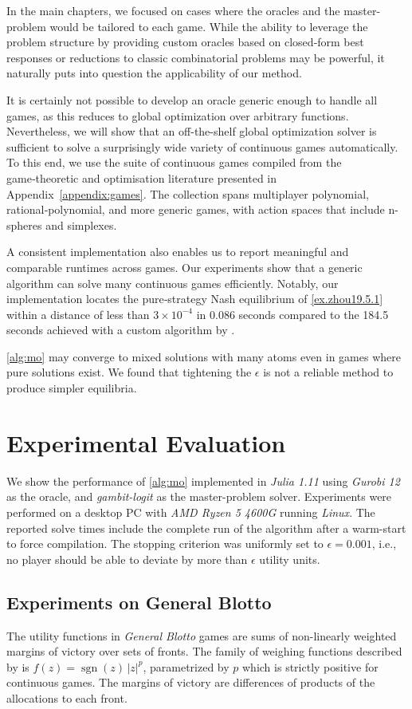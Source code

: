 \documentclass[../main.tex]{subfiles}
\begin{document}
In the main chapters, we focused on cases where the oracles and the master-problem would be tailored to each game. While the ability to leverage the problem structure by providing custom oracles based on closed‑form best responses or reductions to classic combinatorial problems may be powerful, it naturally puts into question the applicability of our method.

It is certainly not possible to develop an oracle generic enough to handle all games, as this reduces to global optimization over arbitrary functions. Nevertheless, we will show that an off-the-shelf global optimization solver is sufficient to solve a surprisingly wide variety of continuous games automatically. To this end, we use the suite of continuous games compiled from the game‑theoretic and optimisation literature presented in Appendix~\ref{appendix:games}. The collection spans multiplayer polynomial, rational‑polynomial, and more generic games, with action spaces that include n-spheres and simplexes.

A consistent implementation also enables us to report meaningful and comparable runtimes across games. Our experiments show that a generic algorithm can solve many continuous games efficiently. Notably, our implementation locates the pure‑strategy Nash equilibrium of \cref{ex.zhou19.5.1} within a distance of less than $3\times 10^{-4}$ in 0.086 seconds compared to the 184.5 seconds achieved with a custom algorithm by \textcite{zhou.wang.ea:saddle}.

\cref{alg:mo} may converge to mixed solutions with many atoms even in games where pure solutions exist. We found that tightening the $\epsilon$ is not a reliable method to produce simpler equilibria.

\section{Experimental Evaluation}
We show the performance of \cref{alg:mo} implemented in \emph{Julia 1.11} using \emph{Gurobi 12} as the oracle, and \emph{gambit-logit} as the master-problem solver. Experiments were performed on a desktop PC with \emph{AMD Ryzen 5 4600G} running \emph{Linux}. The reported solve times include the complete run of the algorithm after a warm-start to force compilation. The stopping criterion was uniformly set to $\epsilon=0.001$, i.e., no player should be able to deviate by more than $\epsilon$ utility units.

\subsection{Experiments on General Blotto}
The utility functions in \emph{General Blotto} games are sums of non-linearly weighted margins of victory over sets of fronts. The family of weighing functions described by \textcite{Golman2009} is \(f(z) = \operatorname{sgn}(z)\,|z|^p\), parametrized by $p$ which is strictly positive for continuous games. The margins of victory are differences of products of the allocations to each front.
\end{document}
